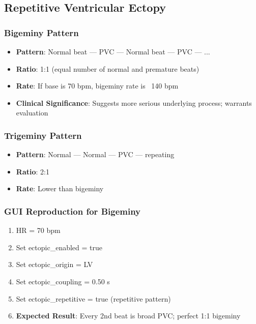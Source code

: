 \documentclass[11pt, a4paper]{article}
\begin{document}
\subsection{Repetitive Ventricular Ectopy}

\subsubsection{Bigeminy Pattern}
\begin{itemize}
    \item \textbf{Pattern}: Normal beat --- PVC --- Normal beat --- PVC --- ...
    \item \textbf{Ratio}: 1:1 (equal number of normal and premature beats)
    \item \textbf{Rate}: If base is 70 bpm, bigeminy rate is ~140 bpm
    \item \textbf{Clinical Significance}: Suggests more serious underlying process; warrants evaluation
\end{itemize}

\subsubsection{Trigeminy Pattern}
\begin{itemize}
    \item \textbf{Pattern}: Normal --- Normal --- PVC --- repeating
    \item \textbf{Ratio}: 2:1
    \item \textbf{Rate}: Lower than bigeminy
\end{itemize}

\subsubsection{GUI Reproduction for Bigeminy}
\begin{enumerate}
    \item HR = 70 bpm
    \item Set ectopic\_enabled = true
    \item Set ectopic\_origin = LV
    \item Set ectopic\_coupling = 0.50 s
    \item Set ectopic\_repetitive = true (repetitive pattern)
    \item \textbf{Expected Result}: Every 2nd beat is broad PVC; perfect 1:1 bigeminy
\end{enumerate}
\end{document}
